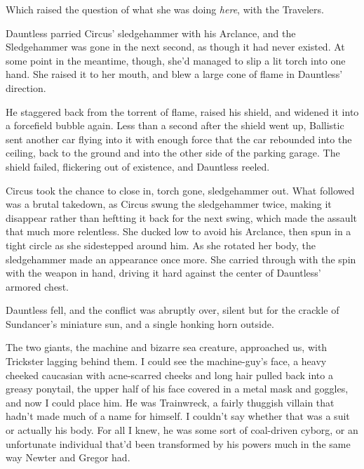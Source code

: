 Which raised the question of what she was doing \emph{here}, with the Travelers.



Dauntless parried Circus' sledgehammer with his Arclance, and the Sledgehammer was gone in the next second, as though it had never existed.  At some point in the meantime, though, she'd managed to slip a lit torch into one hand.  She raised it to her mouth, and blew a large cone of flame in Dauntless' direction.



He staggered back from the torrent of flame, raised his shield, and widened it into a forcefield bubble again.  Less than a second after the shield went up, Ballistic sent another car flying into it with enough force that the car rebounded into the ceiling, back to the ground and into the other side of the parking garage.  The shield failed, flickering out of existence, and Dauntless reeled.



Circus took the chance to close in, torch gone, sledgehammer out.  What followed was a brutal takedown, as Circus swung the sledgehammer twice, making it disappear rather than heftting it back for the next swing, which made the assault that much more relentless.  She ducked low to avoid his Arclance, then spun in a tight circle as she sidestepped around him.  As she rotated her body, the sledgehammer made an appearance once more.  She carried through with the spin with the weapon in hand, driving it hard against the center of Dauntless' armored chest.



Dauntless fell, and the conflict was abruptly over, silent but for the crackle of Sundancer's miniature sun, and a single honking horn outside.



The two giants, the machine and bizarre sea creature, approached us, with Trickster lagging behind them.  I could see the machine-guy's face, a heavy cheeked caucasian with acne-scarred cheeks and long hair pulled back into a greasy ponytail, the upper half of his face covered in a metal mask and goggles, and now I could place him.  He was Trainwreck, a fairly thuggish villain that hadn't made much of a name for himself.  I couldn't say whether that was a suit or actually his body.  For all I knew, he was some sort of coal-driven cyborg, or an unfortunate individual that'd been transformed by his powers much in the same way Newter and Gregor had.



